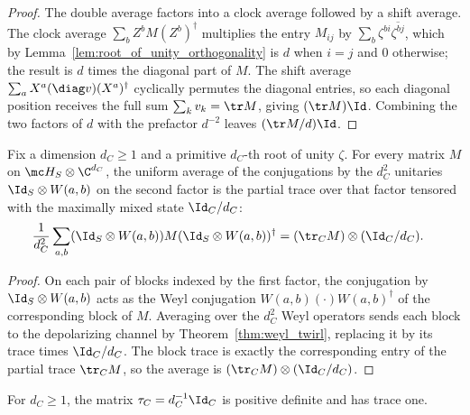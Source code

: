 \begin{proof}\leanok
    The double average factors into a clock average followed by a shift average.
    The clock average $\sum_bZ^bM(Z^b)^\dagger$ multiplies the entry
    $M_{ij}$ by $\sum_b\zeta^{bi}\overline{\zeta^{bj}}$, which by
    Lemma~\ref{lem:root_of_unity_orthogonality} is $d$ when $i=j$ and $0$
    otherwise; the result is $d$ times the diagonal part of $M$. The shift
    average $\sum_aX^a(\diag v)(X^a)^\dagger$
    cyclically permutes the diagonal entries, so each diagonal position receives
    the full sum $\sum_kv_k=\tr M$, giving $(\tr M)\Id$. Combining the two
    factors of $d$ with the prefactor $d^{-2}$ leaves $(\tr M/d)\Id$.
\end{proof}

\begin{lemma}
    \label{lem:twirl_partial_trace}
    \leanok
    Fix a dimension $d_C\ge1$ and a primitive $d_C$-th root of unity $\zeta$.
    For every matrix $M$ on $\mc H_S\otimes\C^{d_C}$, the uniform
    average of the conjugations by the $d_C^2$ unitaries
    $\Id_S\otimes W(a,b)$ on the second factor is the partial trace over
    that factor tensored with the maximally mixed state $\Id_C/d_C$:
    \begin{align}
        \frac{1}{d_C^2}\sum_{a,b}
        (\Id_S\otimes W(a,b))M(\Id_S\otimes W(a,b))^\dagger
         & =(\tr_C M)\otimes(\Id_C/d_C).
        \label{eq:entropy_partial_trace_twirl}
    \end{align}
\end{lemma}

\begin{proof}\leanok
    On each pair of blocks indexed by the first factor, the conjugation by
    $\Id_S\otimes W(a,b)$ acts as the Weyl conjugation
    $W(a,b)(\cdot)W(a,b)^\dagger$ of the corresponding block of $M$.
    Averaging over the $d_C^2$ Weyl operators sends each block to the
    depolarizing channel by Theorem~\ref{thm:weyl_twirl}, replacing it by its
    trace times $\Id_C/d_C$. The block trace is exactly the corresponding
    entry of the partial trace $\tr_C M$, so the average is
    $(\tr_C M)\otimes(\Id_C/d_C)$.
\end{proof}

\begin{theorem}
    \label{thm:maximally_mixed_ancilla}
    \leanok
    For $d_C\ge1$, the matrix $\tau_C=d_C^{-1}\Id_C$ is positive
    definite and has trace one.
\end{theorem}

